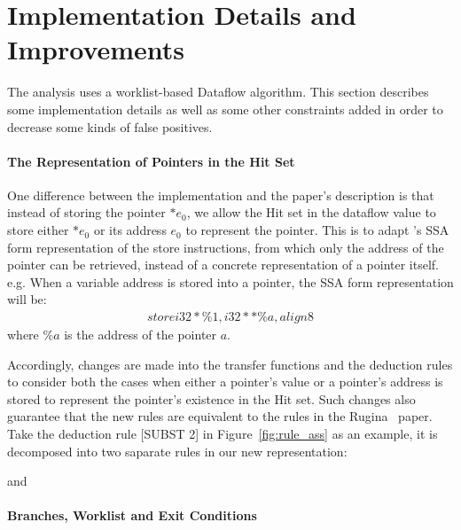 \section{Implementation Details and Improvements}
\label{s:implementation}

The analysis uses a worklist-based Dataflow algorithm. 
This section describes some implementation details as well as some other 
constraints added in order to decrease some kinds of false positives.

\paragraph{The Representation of Pointers in the Hit Set}

One difference between the implementation and the paper's description is that 
instead of storing the pointer ${*e_0}$,
we allow the Hit set in the dataflow value to store either ${*e_0}$ or its 
address ${e_0}$ to represent the pointer. This is to adapt \llvm's SSA form 
representation of the store instructions, from which only the address of the 
pointer can be retrieved, instead of a concrete representation of a pointer itself. 
e.g. When a variable address is stored into a pointer, the SSA form 
representation will be:
\begin{align*}
store i32* \%1, i32** \%a, align 8
\end{align*}
where $\%a$ is the address of the pointer $a$.

Accordingly, changes are made into the transfer functions and the deduction 
rules to consider both the cases when either a pointer's value or a pointer's 
address is stored to represent the pointer's existence in the Hit set. 
Such changes also guarantee that the new rules are equivalent to the rules in 
the Rugina~\cite{rugina} paper. Take the deduction rule [SUBST 2] in 
Figure~\ref{fig:rule_ass} 
as an example, it is decomposed into two saparate rules in our new representation:
\begin{prooftree}
\end{prooftree}
and
\begin{prooftree}
\end{prooftree}


\paragraph{Branches, Worklist and Exit Conditions}

